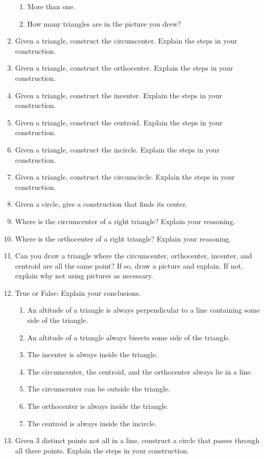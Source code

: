 \begin{enumerate}
\begin{enumerate}
\item More than one.
\item How many triangles are in the picture you drew?
\end{enumerate}
\item Given a triangle, construct the circumcenter. Explain the steps
  in your construction.
\item Given a triangle, construct the orthocenter. Explain the steps
  in your construction.
\item Given a triangle, construct the incenter. Explain the steps in
  your construction.
\item Given a triangle, construct the centroid. Explain the steps in
  your construction.
\item Given a triangle, construct the incircle. Explain the steps in
  your construction.
\item Given a triangle, construct the circumcircle. Explain the steps
  in your construction.
\item Given a circle, give a construction that finds its center. 
\item Where is the circumcenter of a right triangle? Explain your
  reasoning.
\item Where is the orthocenter of a right triangle? Explain your
  reasoning.
\item Can you draw a triangle where the circumcenter, orthocenter,
  incenter, and centroid are all the same point?  If so, draw a
  picture and explain. If not, explain why not using pictures as
  necessary.
\item True or False: Explain your conclusions.
\begin{enumerate}
\item An altitude of a triangle is always perpendicular to a line
  containing some side of the triangle.
\item An altitude of a triangle always bisects some side of the
  triangle.
\item The incenter is always inside the triangle.
\item The circumcenter, the centroid, and the orthocenter always lie in a line.
\item The circumcenter can be outside the triangle.
\item The orthocenter is always inside the triangle.
\item The centroid is always inside the incircle.
\end{enumerate}
\item Given 3 distinct points not all in a line, construct a circle
  that passes through all three points. Explain the steps in your
  construction.
\end{enumerate}

